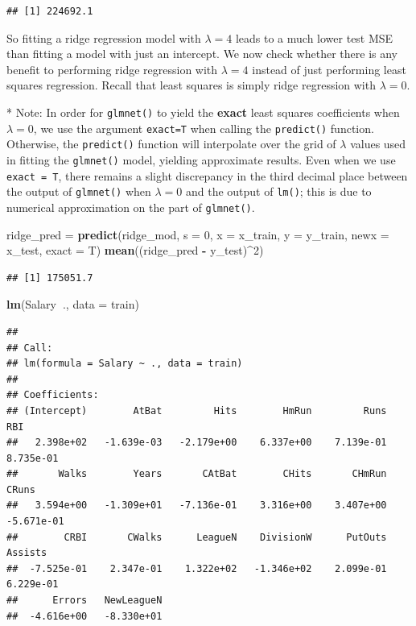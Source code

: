 \documentclass[
  openany]{book}
\newenvironment{Shaded}{\begin{snugshade}}{\end{snugshade}}
\newcommand{\DataTypeTok}[1]{\textcolor[rgb]{0.13,0.29,0.53}{#1}}
\newcommand{\DecValTok}[1]{\textcolor[rgb]{0.00,0.00,0.81}{#1}}
\newcommand{\KeywordTok}[1]{\textcolor[rgb]{0.13,0.29,0.53}{\textbf{#1}}}
\newcommand{\NormalTok}[1]{#1}
\newcommand{\OperatorTok}[1]{\textcolor[rgb]{0.81,0.36,0.00}{\textbf{#1}}}
\newcommand{\StringTok}[1]{\textcolor[rgb]{0.31,0.60,0.02}{#1}}
\begin{document}
\begin{verbatim}
## [1] 224692.1
\end{verbatim}

So fitting a ridge regression model with \(\lambda = 4\) leads to a much lower test
MSE than fitting a model with just an intercept. We now check whether
there is any benefit to performing ridge regression with \(\lambda = 4\) instead of
just performing least squares regression. Recall that least squares is simply
ridge regression with \(\lambda = 0\).

* Note: In order for \texttt{glmnet()} to yield the \textbf{exact} least squares coefficients when \(\lambda = 0\),
we use the argument \texttt{exact=T} when calling the \texttt{predict()} function. Otherwise, the
\texttt{predict()} function will interpolate over the grid of \(\lambda\) values used in fitting the
\texttt{glmnet()} model, yielding approximate results. Even when we use \texttt{exact\ =\ T}, there remains
a slight discrepancy in the third decimal place between the output of \texttt{glmnet()} when
\(\lambda = 0\) and the output of \texttt{lm()}; this is due to numerical approximation on the part of
\texttt{glmnet()}.

\begin{Shaded}
\begin{Highlighting}[]
\NormalTok{ridge_pred =}\StringTok{ }\KeywordTok{predict}\NormalTok{(ridge_mod, }\DataTypeTok{s =} \DecValTok{0}\NormalTok{, }\DataTypeTok{x =}\NormalTok{ x_train, }\DataTypeTok{y =}\NormalTok{ y_train, }\DataTypeTok{newx =}\NormalTok{ x_test, }\DataTypeTok{exact =}\NormalTok{ T)}
\KeywordTok{mean}\NormalTok{((ridge_pred }\OperatorTok{-}\StringTok{ }\NormalTok{y_test)}\OperatorTok{^}\DecValTok{2}\NormalTok{)}
\end{Highlighting}
\end{Shaded}

\begin{verbatim}
## [1] 175051.7
\end{verbatim}

\begin{Shaded}
\begin{Highlighting}[]
\KeywordTok{lm}\NormalTok{(Salary}\OperatorTok{~}\NormalTok{., }\DataTypeTok{data =}\NormalTok{ train)}
\end{Highlighting}
\end{Shaded}

\begin{verbatim}
## 
## Call:
## lm(formula = Salary ~ ., data = train)
## 
## Coefficients:
## (Intercept)        AtBat         Hits        HmRun         Runs          RBI  
##   2.398e+02   -1.639e-03   -2.179e+00    6.337e+00    7.139e-01    8.735e-01  
##       Walks        Years       CAtBat        CHits       CHmRun        CRuns  
##   3.594e+00   -1.309e+01   -7.136e-01    3.316e+00    3.407e+00   -5.671e-01  
##        CRBI       CWalks      LeagueN    DivisionW      PutOuts      Assists  
##  -7.525e-01    2.347e-01    1.322e+02   -1.346e+02    2.099e-01    6.229e-01  
##      Errors   NewLeagueN  
##  -4.616e+00   -8.330e+01
\end{verbatim}
\end{document}
